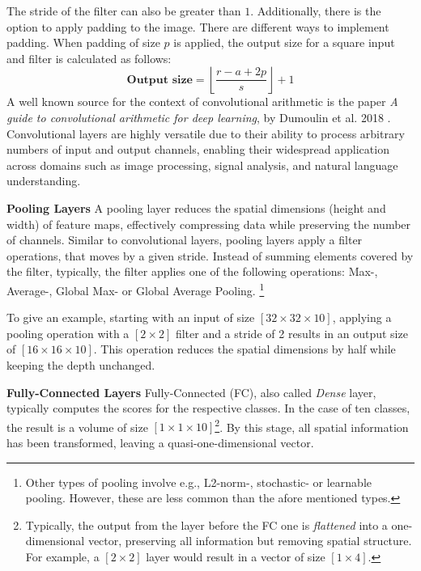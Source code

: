 The stride of the filter can also be greater than $1$. Additionally, there is the option to apply padding to the image. There are different ways to implement padding. When padding of size $p$ is applied, the output size for a square input and filter is calculated as follows:
\[
\textbf{Output size} = \left\lfloor \frac{r - a + 2p}{s} \right\rfloor + 1
\]
A well known source for the context of convolutional arithmetic is the paper \textit{A guide to convolutional arithmetic for deep learning}, by Dumoulin et al. 2018 \cite{Dumoulin2016TransposedConv}. Convolutional layers are highly versatile due to their ability to process arbitrary numbers of input and output channels, enabling their widespread application across domains such as image processing, signal analysis, and natural language understanding.

\vspace{1em}

\textbf{Pooling Layers}\label{theoretical_classification_pooling_layers}
A pooling layer reduces the spatial dimensions (height and width) of feature maps, effectively compressing data while preserving the number of channels. Similar to convolutional layers, pooling layers apply a filter operations, that moves by a given stride. Instead of summing elements covered by the filter, typically, the filter applies one of the following operations: Max-, Average-, Global Max- or Global Average Pooling. \footnote{Other types of pooling involve e.g., L2-norm-, stochastic- or learnable pooling. However, these are less common than the afore mentioned types.}

To give an example, starting with an input of size $[32 \times 32 \times 10]$, applying a pooling operation with a $[2 \times 2]$ filter and a stride of 2 results in an output size of $[16 \times 16 \times 10]$. This operation reduces the spatial dimensions by half while keeping the depth unchanged.

\vspace{1em}

\textbf{Fully-Connected Layers}\label{theoretical_classification_fully_connected_layers}
Fully-Connected (FC), also called \textit{Dense} layer, typically computes the scores for the respective classes. In the case of ten classes, the result is a volume of size $[1 \times 1 \times 10]$\footnote{Typically, the output from the layer before the FC one is \textit{flattened} into a one-dimensional vector, preserving all information but removing spatial structure. For example, a $[2 \times 2]$ layer would result in a vector of size $[1 \times 4]$.}. By this stage, all spatial information has been transformed, leaving a quasi-one-dimensional vector. 

